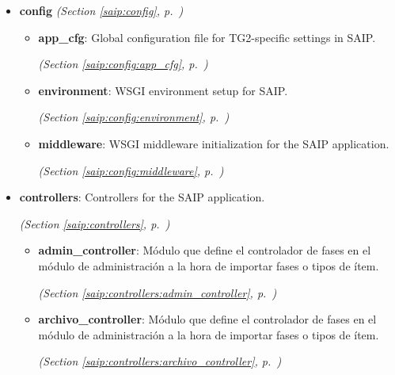 \begin{itemize}
\setlength{\parskip}{0ex}
\item \textbf{config}
  \textit{(Section \ref{saip:config}, p.~\pageref{saip:config})}

  \begin{itemize}
\setlength{\parskip}{0ex}
    \item \textbf{app\_cfg}: Global configuration file for TG2-specific settings in SAIP.



  \textit{(Section \ref{saip:config:app_cfg}, p.~\pageref{saip:config:app_cfg})}

    \item \textbf{environment}: WSGI environment setup for SAIP.



  \textit{(Section \ref{saip:config:environment}, p.~\pageref{saip:config:environment})}

    \item \textbf{middleware}: WSGI middleware initialization for the SAIP application.



  \textit{(Section \ref{saip:config:middleware}, p.~\pageref{saip:config:middleware})}

  \end{itemize}
\item \textbf{controllers}: Controllers for the SAIP application.



  \textit{(Section \ref{saip:controllers}, p.~\pageref{saip:controllers})}

  \begin{itemize}
\setlength{\parskip}{0ex}
    \item \textbf{admin\_controller}: Módulo que define el controlador de fases en el módulo de administración a 
la hora de importar fases o tipos de ítem.



  \textit{(Section \ref{saip:controllers:admin_controller}, p.~\pageref{saip:controllers:admin_controller})}

    \item \textbf{archivo\_controller}: Módulo que define el controlador de fases en el módulo de administración a 
la hora de importar fases o tipos de ítem.



  \textit{(Section \ref{saip:controllers:archivo_controller}, p.~\pageref{saip:controllers:archivo_controller})}


\end{itemize}
\end{itemize}
